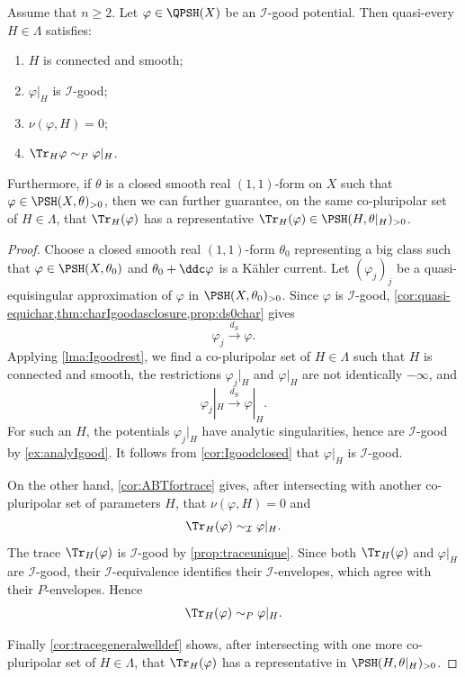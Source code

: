 \begin{corollary}\label{cor:rest_gen_very_good}
Assume that $n\geq 2$.
    Let $\varphi\in \QPSH(X)$ be an $\mathcal{I}$-good potential. Then quasi-every $H\in \Lambda$ satisfies:
    \begin{enumerate}
        \item\label{itm:chapter-trace:L1071:1} $H$ is connected and smooth;
        \item\label{itm:chapter-trace:L1071:2} $\varphi|_H$ is $\mathcal{I}$-good;
        \item\label{itm:chapter-trace:L1071:3} $\nu(\varphi,H)=0$;
        \item\label{itm:chapter-trace:L1071:4} $\Tr_H \varphi\sim_P \varphi|_H$.
    \end{enumerate}
    Furthermore, if $\theta$ is a closed smooth real $(1,1)$-form on $X$ such that $\varphi\in \PSH(X,\theta)_{>0}$, then we can further guarantee, on the same co-pluripolar set of $H\in \Lambda$, that $\Tr_H(\varphi)$ has a representative $\Tr_H(\varphi)\in \PSH(H,\theta|_H)_{>0}$.
\end{corollary}
\begin{proof}
    Choose a closed smooth real $(1,1)$-form $\theta_0$ representing a big class such that $\varphi\in \PSH(X,\theta_0)$ and $\theta_0+\ddc \varphi$ is a Kähler current. Let $(\varphi_j)_j$ be a quasi-equisingular approximation of $\varphi$ in $\PSH(X,\theta_0)_{>0}$. Since $\varphi$ is $\mathcal I$-good, \cref{cor:quasi-equichar,thm:charIgoodasclosure,prop:ds0char} gives
    \[
        \varphi_j\xrightarrow{d_S}\varphi.
    \]
    Applying \cref{lma:Igoodrest}, we find a co-pluripolar set of $H\in\Lambda$ such that $H$ is connected and smooth, the restrictions $\varphi_j|_H$ and $\varphi|_H$ are not identically $-\infty$, and
    \[
        \varphi_j|_H\xrightarrow{d_S}\varphi|_H.
    \]
    For such an $H$, the potentials $\varphi_j|_H$ have analytic singularities, hence are $\mathcal I$-good by \cref{ex:analyIgood}. It follows from \cref{cor:Igoodclosed} that $\varphi|_H$ is $\mathcal I$-good.

    On the other hand, \cref{cor:ABTfortrace} gives, after intersecting with another co-pluripolar set of parameters $H$, that $\nu(\varphi,H)=0$ and
    \[
        \Tr_H(\varphi)\sim_{\mathcal I}\varphi|_H.
    \]
    The trace $\Tr_H(\varphi)$ is $\mathcal I$-good by \cref{prop:traceunique}. Since both $\Tr_H(\varphi)$ and $\varphi|_H$ are $\mathcal I$-good, their $\mathcal I$-equivalence identifies their $\mathcal I$-envelopes, which agree with their $P$-envelopes. Hence
    \[
        \Tr_H(\varphi)\sim_P\varphi|_H.
    \]

    Finally \cref{cor:tracegeneralwelldef} shows, after intersecting with one more co-pluripolar set of $H\in\Lambda$, that $\Tr_H(\varphi)$ has a representative in $\PSH(H,\theta|_H)_{>0}$.
\end{proof}


